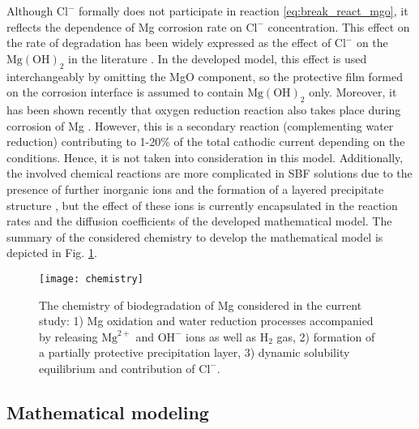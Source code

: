Although $\mathrm{Cl}^{-}$ formally does not participate in reaction \ref{eq:break_react_mgo}, it reflects the dependence of Mg corrosion rate on $\mathrm{Cl}^{-}$ concentration. This effect on the rate of degradation has been widely expressed as the effect of $\mathrm{Cl}^{-}$ on the $\mathrm{Mg}(\mathrm{OH})_{2}$ in the literature \cite{Zheng2014,Zhao2017}. In the developed model, this effect is used interchangeably by omitting the MgO component, so the protective film formed on the corrosion interface is assumed to contain $\mathrm{Mg}(\mathrm{OH})_{2}$ only. Moreover, it has been shown recently that oxygen reduction reaction also takes place during corrosion of Mg \cite{Wang2020,Strebl2020,Silva2018}. However, this is a secondary reaction (complementing water reduction) contributing to 1-20\% of the total cathodic current depending on the conditions. Hence, it is not taken into consideration in this model.  Additionally, the involved chemical reactions are more complicated in SBF solutions due to the presence of further inorganic ions and the formation of a layered precipitate structure  \cite{Mei2020}, but the effect of these ions is currently encapsulated in the reaction rates and the diffusion  coefficients of the developed mathematical model. The summary of the considered chemistry to develop the mathematical model is depicted in Fig. \ref{fig:chemistry}.


\begin{figure}[h]
\center \texttt{[image: chemistry]}
\caption{The chemistry of biodegradation of Mg considered in the current study: 1) Mg oxidation and water reduction processes accompanied by releasing $\mathrm{Mg}^{2+}$ and $\mathrm{OH}^{-}$  ions as well as $\mathrm{H}_2$ gas, 2) formation of a partially protective precipitation layer, 3) dynamic solubility equilibrium and contribution of $\mathrm{Cl}^{-}$.} \label{fig:chemistry}
\end{figure}

\subsection{Mathematical modeling}

